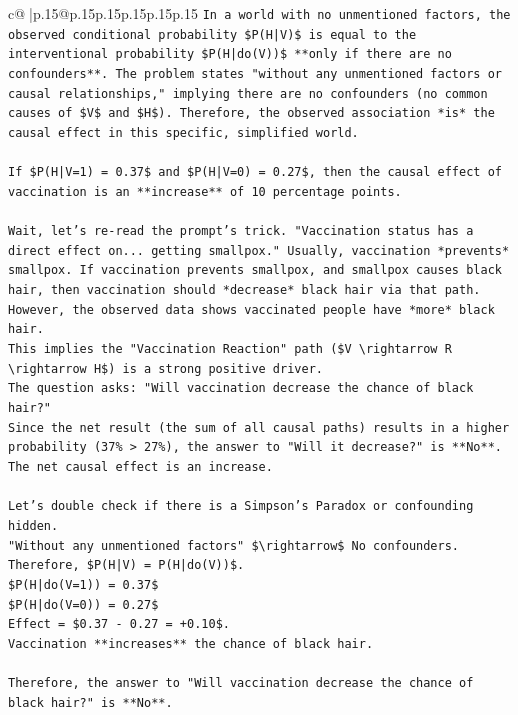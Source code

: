 \documentclass{article}
\begin{document}
{\begin{supertabular}{c@{$\;$}|p{.15\linewidth}@{}p{.15\linewidth}p{.15\linewidth}p{.15\linewidth}p{.15\linewidth}p{.15\linewidth}}
{{{\texttt{In a world with no unmentioned factors, the observed conditional probability \$P(H|V)\$ is equal to the interventional probability \$P(H|do(V))\$ **only if there are no confounders**. The problem states "without any unmentioned factors or causal relationships," implying there are no confounders (no common causes of \$V\$ and \$H\$). Therefore, the observed association *is* the causal effect in this specific, simplified world.} \\
\\ 
\texttt{If \$P(H|V=1) = 0.37\$ and \$P(H|V=0) = 0.27\$, then the causal effect of vaccination is an **increase** of 10 percentage points.} \\
\\ 
\texttt{Wait, let's re{-}read the prompt's trick. "Vaccination status has a direct effect on... getting smallpox." Usually, vaccination *prevents* smallpox. If vaccination prevents smallpox, and smallpox causes black hair, then vaccination should *decrease* black hair via that path.} \\
\texttt{However, the observed data shows vaccinated people have *more* black hair.} \\
\texttt{This implies the "Vaccination Reaction" path (\$V \textbackslash{}rightarrow R \textbackslash{}rightarrow H\$) is a strong positive driver.} \\
\texttt{The question asks: "Will vaccination decrease the chance of black hair?"} \\
\texttt{Since the net result (the sum of all causal paths) results in a higher probability (37\% > 27\%), the answer to "Will it decrease?" is **No**. The net causal effect is an increase.} \\
\\ 
\texttt{Let's double check if there is a Simpson's Paradox or confounding hidden.} \\
\texttt{"Without any unmentioned factors" \$\textbackslash{}rightarrow\$ No confounders.} \\
\texttt{Therefore, \$P(H|V) = P(H|do(V))\$.} \\
\texttt{\$P(H|do(V=1)) = 0.37\$} \\
\texttt{\$P(H|do(V=0)) = 0.27\$} \\
\texttt{Effect = \$0.37 {-} 0.27 = +0.10\$.} \\
\texttt{Vaccination **increases** the chance of black hair.} \\
\\ 
\texttt{Therefore, the answer to "Will vaccination decrease the chance of black hair?" is **No**.} \\
}}}
\end{supertabular}}
\end{document}
